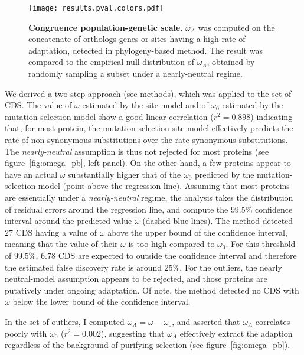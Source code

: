 \documentclass{article}
\begin{document}
\begin{figure*}[h]
	\centering
	\texttt{[image: results.pval.colors.pdf]}
	\caption{ \textbf{Congruence population-genetic scale}.
	$\omega_A$ was computed on the concatenate of orthologs genes or sites having a high rate of adaptation, detected in phylogeny-based method.
	The result was compared to the empirical null distribution of $\omega_A$, obtained by randomly sampling a subset under a nearly-neutral regime.
	}
\end{figure*}


We derived a two-step approach (see methods), which was applied to the set of CDS.
The value of $\omega$ estimated by the site-model and of $\omega_{0}$ estimated by the mutation-selection model show a good linear correlation ($r^2=0.898$) indicating that, for most protein, the mutation-selection site-model effectively predicts the rate of non-synonymous substitutions over the rate synonymous substitutions.
The \textit{nearly-neutral} assumption is thus not rejected for most proteins (see figure~\ref{fig:omega_pb}, left panel).
On the other hand, a few proteins appear to have an actual $\omega$ substantially higher that of the $\omega_0$ predicted by the mutation-selection model (point above the regression line).
Assuming that most proteins are essentially under a \textit{nearly-neutral} regime, the analysis takes the distribution of residual errors around the regression line, and compute the $99.5\%$ confidence interval around the predicted value $\omega$ (dashed blue lines).
The method detected $27$ CDS having a value of $\omega$ above the upper bound of the confidence interval, meaning that the value of their $\omega$ is too high compared to $\omega_{0}$.
For this threshold of $99.5\%$, $6.78$ CDS are expected to outside the confidence interval and therefore the estimated false discovery rate is around $25 \%$.
For the outliers, the nearly neutral-model assumption appears to be rejected, and those proteins are putatively under ongoing adaptation.
Of note, the method detected no CDS with $\omega$ below the lower bound of the confidence interval.

In the set of outliers, I computed  $\omega_A = \omega - \omega_0$, and asserted that $\omega_A$ correlates poorly with $ \omega_0$ ($r^2=0.002$), suggesting that $\omega_A$ effectively extract the adaption regardless of the background of purifying selection (see figure~\ref{fig:omega_pb}).
\end{document}
